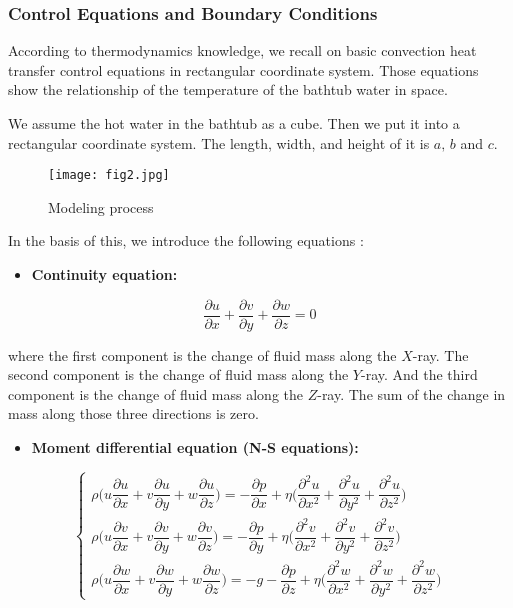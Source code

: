 \documentclass{mcmthesis}
\begin{document}
\subsubsection{Control Equations and Boundary Conditions}

According to thermodynamics knowledge, we recall on basic convection
heat transfer control equations in rectangular coordinate system. Those
equations show the relationship of the temperature of the bathtub water in space.

We assume the hot water in the bathtub as a cube. Then we put it into a
rectangular coordinate system. The length, width, and height of it is $a,\, b$ and $c$.

\begin{figure}[h] 
\centering
\texttt{[image: fig2.jpg]}
\caption{Modeling process} \label{fig2}
\end{figure}

In the basis of this, we introduce the following equations :

\begin{itemize}[leftmargin=*]
\item {\bf Continuity equation:}
\end{itemize}

\begin{equation} \label{eq1}
\frac{\partial u}{\partial x} + \frac{\partial v}{\partial y} +\frac{\partial w}{\partial z} =0
\end{equation}

\noindent where the first component is the change of fluid mass along the $X$-ray. The second component is the change of fluid mass along the $Y$-ray. And the third component is the change of fluid mass along the $Z$-ray. The sum of the change in mass along those three directions is zero.

\begin{itemize}[leftmargin=*]
\item {\bf Moment differential equation (N-S equations):}
\end{itemize}

\begin{equation} \label{eq2}
\left\{
\begin{array}{l} \!\!
\rho \Big(u \dfrac{\partial u}{\partial x} + v \dfrac{\partial u}{\partial y} + w\dfrac{\partial u}{\partial z} \Big) = -\dfrac{\partial p}{\partial x} + \eta \Big(\dfrac{\partial^2 u}{\partial x^2} + \dfrac{\partial^2 u}{\partial y^2} + \dfrac{\partial^2 u}{\partial z^2} \Big) \\[0.3cm]
\rho \Big(u \dfrac{\partial v}{\partial x} + v \dfrac{\partial v}{\partial y} + w\dfrac{\partial v}{\partial z} \Big) = -\dfrac{\partial p}{\partial y} + \eta \Big(\dfrac{\partial^2 v}{\partial x^2} + \dfrac{\partial^2 v}{\partial y^2} + \dfrac{\partial^2 v}{\partial z^2} \Big) \\[0.3cm]
\rho \Big(u \dfrac{\partial w}{\partial x} + v \dfrac{\partial w}{\partial y} + w\dfrac{\partial w}{\partial z} \Big) = -g-\dfrac{\partial p}{\partial z} + \eta \Big(\dfrac{\partial^2 w}{\partial x^2} + \dfrac{\partial^2 w}{\partial y^2} + \dfrac{\partial^2 w}{\partial z^2} \Big)  
\end{array}
\right.
\end{equation}
\end{document}
